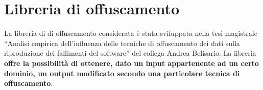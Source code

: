 \section{Libreria di offuscamento}
\label{liboff}
La libreria di di offuscamento considerata è stata sviluppata nella tesi magistrale “Analisi empirica dell'influenza delle tecniche di offuscamento dei dati sulla riproduzione dei fallimenti del software” del collega Andrea Belisario. La libreria  \textbf{offre la possibilità di ottenere, dato un input appartenente ad un certo dominio, un output modificato  secondo una particolare tecnica di offuscamento}.


